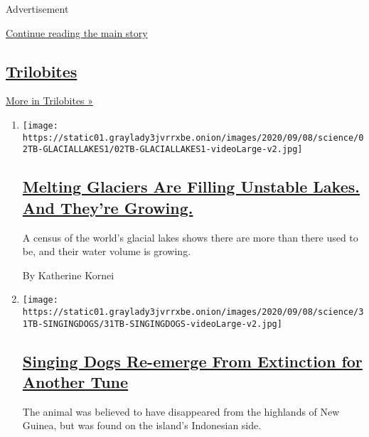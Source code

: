 Advertisement

\protect\hyperlink{after-mid1}{Continue reading the main story}

\hypertarget{trilobites-5}{%
\subsection{\texorpdfstring{\href{/column/trilobites}{Trilobites}}{Trilobites}}\label{trilobites-5}}

\href{/column/trilobites}{More in Trilobites »}

\begin{enumerate}
\def\labelenumi{\arabic{enumi}.}
\item
  \texttt{[image: https://static01.graylady3jvrrxbe.onion/images/2020/09/08/science/02TB-GLACIALLAKES1/02TB-GLACIALLAKES1-videoLarge-v2.jpg]}

  \hypertarget{melting-glaciers-are-filling-unstable-lakes-and-theyre-growing}{%
  \subsection{\texorpdfstring{\href{/2020/09/02/science/global-warming-glacial-lakes.html}{Melting
  Glaciers Are Filling Unstable Lakes. And They're
  Growing.}}{Melting Glaciers Are Filling Unstable Lakes. And They're Growing.}}\label{melting-glaciers-are-filling-unstable-lakes-and-theyre-growing}}

  A census of the world's glacial lakes shows there are more than there
  used to be, and their water volume is growing.

  By Katherine Kornei
\item
  \texttt{[image: https://static01.graylady3jvrrxbe.onion/images/2020/09/08/science/31TB-SINGINGDOGS/31TB-SINGINGDOGS-videoLarge-v2.jpg]}

  \hypertarget{singing-dogs-re-emerge-from-extinction-for-another-tune}{%
  \subsection{\texorpdfstring{\href{/2020/08/31/science/singing-dog-new-guinea.html}{Singing
  Dogs Re-emerge From Extinction for Another
  Tune}}{Singing Dogs Re-emerge From Extinction for Another Tune}}\label{singing-dogs-re-emerge-from-extinction-for-another-tune}}

  The animal was believed to have disappeared from the highlands of New
  Guinea, but was found on the island's Indonesian side.


\end{enumerate}
